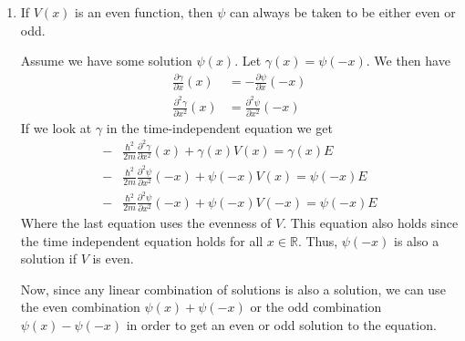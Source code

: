 \documentclass{article}
\newcommand{\ddx}[1]{\frac{\partial #1}{\partial x}}
\newcommand{\dddx}[1]{\frac{\partial^2 #1}{\partial x^2}}
\newcommand{\paren}[1]{\left( #1 \right)}
\newenvironment{problem}{\begin{enumerate}[label=(\alph*)]}{\end{enumerate}}
\begin{document}
\begin{problem}
      Assume $\psi = a + ib$ is a solution to the time-independent Schroedinger equation
      $$ -\frac{\hbar^2}{2m}\dddx{\psi} + \psi V = \psi E $$
      Since both $\psi$ and $\psi^*$ solve this, we can plug both in to this equation:
      \begin{align*}
        -\frac{\hbar^2}{2m}\paren{\dddx{a} + i\dddx{b}} + (a + ib) V &= (a + ib) E \\
        -\frac{\hbar^2}{2m}\paren{\dddx{a} - i\dddx{b}} + (a - ib) V &= (a - ib) E 
      \end{align*}
      Adding these equations together we get
      \begin{align*}
        -&\frac{\hbar^2}{2m}\paren{2\dddx{a} + i\dddx{b} - i\dddx{b}} + (2a + ib - ib) V &= (a + ib - ib) E \\
        -&\frac{\hbar^2}{2m}\paren{2\dddx{a}} + 2aV = 2aE \\
        -&\frac{\hbar^2}{2m}\paren{\dddx{a}} + aV = aE
      \end{align*}
      And hence $a = \frac{1}{2} \paren{\psi + \psi^*}$ is also a solution, and has no imaginary component.
      It is worth noting that we should probably use $\frac{1}{\sqrt{2}} \paren{\psi + \psi^*}$ instead, so that we still have a normalized solution.

    \item If $V(x)$ is an even function, then $\psi$ can always be taken to be either even or odd.

      Assume we have some solution $\psi(x)$. Let $\gamma(x) = \psi(-x)$. We then have
      \begin{align*} 
        \ddx{\gamma}(x) &= -\ddx{\psi}(-x) \\
        \dddx{\gamma}(x) &= \dddx{\psi}(-x)
      \end{align*}
      If we look at $\gamma$ in the time-independent equation we get
      \begin{align*}
        -&\frac{\hbar^2}{2m}\dddx{\gamma}(x) + \gamma(x) V(x) = \gamma(x) E  \\
        -&\frac{\hbar^2}{2m}\dddx{\psi}(-x) + \psi(-x) V(x) = \psi(-x) E  \\
        -&\frac{\hbar^2}{2m}\dddx{\psi}(-x) + \psi(-x) V(-x) = \psi(-x) E 
      \end{align*}
     Where the last equation uses the evenness of $V$. 
     This equation also holds since the time independent equation holds for all $x \in \mathbb{R}$.
     Thus, $\psi(-x)$ is also a solution if $V$ is even.

     Now, since any linear combination of solutions is also a solution, we can use the even combination $\psi(x) + \psi(-x)$ or the odd combination $\psi(x) - \psi(-x)$ in order to get an even or odd solution to the equation.
  \end{problem}
\end{document}
